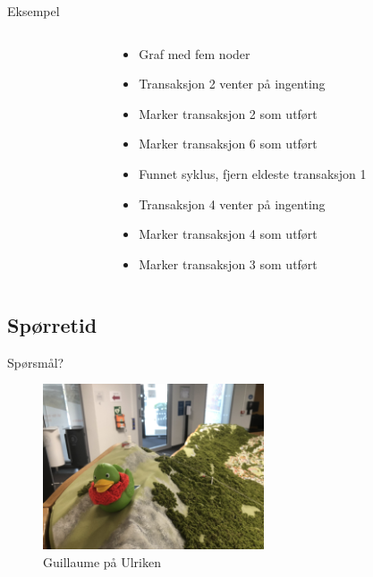 \begin{frame}{Eksempel}
\begin{columns}
    \begin{column}{0.48\textwidth}
 \end{column}
    \begin{column}{0.48\textwidth}
\begin{itemize}
    \item<1-> Graf med fem noder 
    \item<2-> Transaksjon 2 venter på ingenting
    \item<3-> Marker transaksjon 2 som utført
    \item<4-> Marker transaksjon 6 som utført
    \item<5-> Funnet syklus, fjern eldeste transaksjon 1
    \item<6-> Transaksjon 4 venter på ingenting
    \item<7-> Marker transaksjon 4 som utført
    \item<8-> Marker transaksjon 3 som utført
\end{itemize}
 \end{column}
\end{columns}
\end{frame}

\subsection*{Spørretid}
\begin{frame}{Spørsmål?}
    \begin{figure}
        \centering
        \includegraphics[height = 4.9cm]{images/guillaume11.jpg}
        \caption{Guillaume på Ulriken}
        \label{fig:guillaume11}
    \end{figure}
\end{frame}
